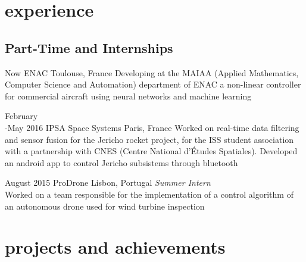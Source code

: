 \documentclass[]{friggeri-cv} %
\begin{document}

\section{experience}


\subsection{Part-Time and Internships}

\begin{entrylist}





\entry
{Now}
{ENAC}
{Toulouse, France}
{Developing at the MAIAA (Applied Mathematics, Computer Science and Automation) department of ENAC a non-linear controller for commercial aircraft using neural networks and machine learning}

\entry
{February\\-May 2016}
{IPSA Space Systems}
{Paris, France}
{Worked on real-time data filtering and sensor fusion for the Jericho rocket project, for the ISS student association with a partnership with CNES (Centre National d'Études Spatiales). Developed an android app to control Jericho subsistems through bluetooth}

\entry
{August 2015}
{ProDrone}
{Lisbon, Portugal}
{\emph{Summer Intern} \\
Worked on a team responsible for the implementation of a control algorithm of an autonomous drone used for wind turbine inspection}



\end{entrylist}


\section{projects and achievements}
\end{document}
